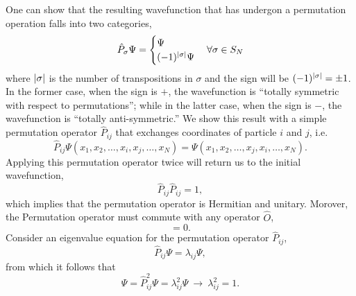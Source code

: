     One can show that the resulting wavefunction that has undergon a permutation operation 
    falls into two categories,
    \begin{equation}
        \hat{P}_\sigma\Psi = 
        \begin{cases}
            \Psi &\\
            (-1)^{\abs{\sigma}}\Psi& 
        \end{cases} \forall \sigma \in S_N
    \end{equation}
    where $\abs{\sigma}$ is the number of transpositions in $\sigma$ and the sign 
    will be $(-1)^{\abs{\sigma}} = \pm 1$. In the former case, when the sign is $+$,
    the wavefunction is ``totally symmetric with respect to permutations''; while in 
    the latter case, when the sign is $-$, the wavefunction is ``totally anti-symmetric.''
    We show this result with a simple permutation operator $\hat{P}_{ij}$ that exchanges 
    coordinates of particle $i$ and $j$, i.e.
    \begin{equation}
        \hat{P}_{ij}\Psi(x_1, x_2, \dots, x_i, x_j, \dots, x_N)
        =  \Psi(x_1, x_2, \dots, x_j, x_i, \dots, x_N).
    \end{equation}
    Applying this permutation operator twice will return us to the initial wavefunction,
    \begin{equation}
        \hat{P}_{ij} \hat{P}_{ij} = 1,
    \end{equation}
    which implies that the permutation operator is Hermitian and unitary. Morover, the 
    Permutation operator must commute with any operator $\hat{O}$,
    \begin{equation}
        [\hat{P}_{ij}, \hat{O}] = 0.
    \end{equation}
    Consider an eigenvalue equation for the permutation operator $\hat{P}_{ij}$,
    \begin{equation}
        \hat{P}_{ij}\Psi = \lambda_{ij}\Psi,
    \end{equation}
    from which it follows that 
    \begin{equation}
        \Psi = \hat{P}_{ij}^2 \Psi = \lambda_{ij}^2\Psi\ \to \  \lambda_{ij}^2 = 1.
    \end{equation}

